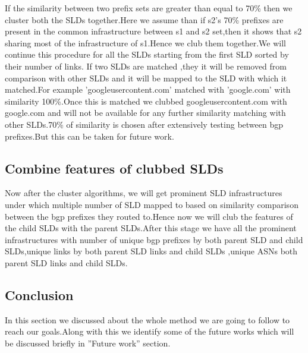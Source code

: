 If the similarity between two prefix sets are greater than equal to 70\% then
we cluster both the SLDs together.Here we assume than if s2’s 70\% prefixes
are present in the common infrastructure between s1 and s2 set,then it shows
that s2 sharing most of the infrastructure of s1.Hence we club them together.We
will continue this procedure for all the SLDs starting from the first SLD sorted
by their number of links. If two SLDs are matched ,they it will be removed from
comparison with other SLDs and it will be mapped to the SLD with which it
matched.For example ’googleusercontent.com’ matched with ’google.com’ with
similarity 100\%.Once this is matched we clubbed googleusercontent.com with
google.com and will not be available for any further similarity matching with other SLDs.70\%
of similarity is chosen after extensively testing between bgp prefixes.But this
can be taken for future work.
\subsection{Combine features of clubbed SLDs}
Now after the cluster algorithms, we will get prominent SLD infrastructures
under which multiple number of SLD mapped to based on similarity comparison
between the bgp prefixes they routed to.Hence now we will club the features of
the child SLDs with the parent SLDs.After this stage we have all the prominent
infrastructures with number of unique bgp prefixes by both parent SLD and child
SLDs,unique links by both parent SLD links and child SLDs ,unique ASNs both
parent SLD links and child SLDs.
\subsection{Conclusion}
In this section we discussed about the whole method we are going to follow to
reach our goals.Along with this we identify some of the future works which will
be discussed briefly in ”Future work” section.